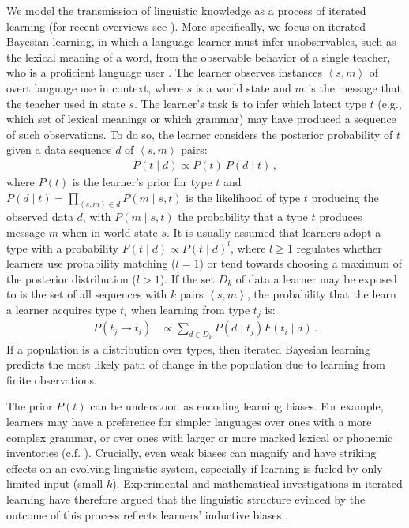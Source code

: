 \documentclass[10pt,a4paper]{article}
\newcommand{\tuple}[1]{\ensuremath{\left\langle #1 \right\rangle}}
\begin{document}
We model the transmission of linguistic knowledge as a process of iterated learning (for recent
overviews see \citealt{kirby+etal:2014, tamariz+kirby:2016}). More specifically, we focus on
iterated Bayesian learning, in which a language learner must infer unobservables, such as the
lexical meaning of a word, from the observable behavior of a single teacher, who is a
proficient language user \citep[e.g.][]{griffiths+kalish:2007,kirby+etal:2007}. The learner
observes instances $\tuple{s,m}$ of overt language use in context, where $s$ is a world state
and $m$ is the message that the teacher used in state $s$. The learner's task is to infer which
latent type $t$ (e.g., which set of lexical meanings or which grammar) may have produced a
sequence of such observations. To do so, the learner considers the posterior probability of $t$
given a data sequence $d$ of $\tuple{s, m}$ pairs:
\begin{align*}
  P(t \mid d) \propto P(t) \ P(d \mid t)\,,
\end{align*}
where $P(t)$ is the learner's prior for type $t$ and
$P(d \mid t) = \prod_{\tuple{s,m} \in d} P(m \mid s, t)$ is the likelihood of type $t$
producing the observed data $d$, with $P(m \mid s, t)$ the probability that a type $t$ produces
message $m$ when in world state $s$. It is usually assumed that learners adopt a type with a
probability $F(t \mid d) \propto P(t \mid d)^l$, where $l \ge 1$ regulates whether learners use
probability matching ($l = 1$) or tend towards choosing a maximum of the posterior distribution
($l > 1$). If the set $D_k$ of data a learner may be exposed to is the set of all
sequences with $k$ pairs $\tuple{s,m}$, the probability that the learn a learner
acquires type $t_i$ when learning from type $t_j$ is:
\begin{align*}
  P(t_j \rightarrow t_i) &\propto \sum_{d \in D_k} P(d \mid t_j) F(t_i \mid d)\,.
\end{align*}
If a population is a distribution over types, then iterated Bayesian learning predicts the most
likely path of change in the population due to learning from finite observations.

The prior $P(t)$ can be understood as encoding learning biases. For example, learners may have
a preference for simpler languages over ones with a more complex grammar, or over ones with larger or more marked
 lexical or phonemic inventories (c.f. \citealt{feldman:2000,chater+vitanyi:2003,
  kirby+etal:2015}). Crucially, even weak biases can magnify and have striking effects on an
evolving linguistic system, especially if learning is fueled by only limited input (small
$k$). Experimental and mathematical investigations in iterated learning have therefore argued
that the linguistic structure evinced by the outcome of this process reflects learners'
inductive biases \citep{kirby+etal:2007,kirby+etal:2014}.
\end{document}
